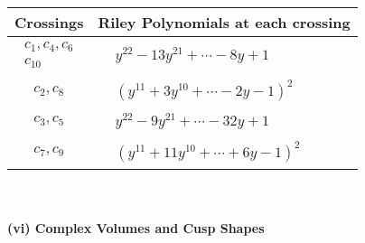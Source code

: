 \documentclass[1p]{elsarticle_modified}
\theoremstyle{definition}
\begin{document}
\begin{tabular}{m{50pt}|m{274pt}}
Crossings & \hspace{64pt}Riley Polynomials at each crossing \\
\hline $$\begin{aligned}c_{1},c_{4},c_{6}\\c_{10}\end{aligned}$$&$\begin{aligned}
&y^{22}-13 y^{21}+\cdots-8 y+1
\end{aligned}$\\
\hline $$\begin{aligned}c_{2},c_{8}\end{aligned}$$&$\begin{aligned}
&(y^{11}+3 y^{10}+\cdots-2 y-1)^{2}
\end{aligned}$\\
\hline $$\begin{aligned}c_{3},c_{5}\end{aligned}$$&$\begin{aligned}
&y^{22}-9 y^{21}+\cdots-32 y+1
\end{aligned}$\\
\hline $$\begin{aligned}c_{7},c_{9}\end{aligned}$$&$\begin{aligned}
&(y^{11}+11 y^{10}+\cdots+6 y-1)^{2}
\end{aligned}$\\
\hline
\end{tabular}\\~\\
\newpage\flushleft \textbf{(vi) Complex Volumes and Cusp Shapes}
\end{document}
